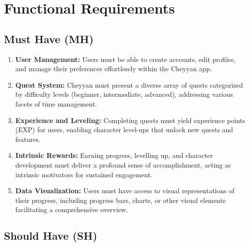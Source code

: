 \documentclass{l4proj}
\begin{document}
\section{Functional Requirements}
\subsection{Must Have (MH)}

\begin{enumerate}
    \item \textbf{User Management:} Users must be able to create accounts, edit profiles, and manage their preferences effortlessly within the Cheyyan app.
    
    \item \textbf{Quest System:} Cheyyan must present a diverse array of quests categorized by difficulty levels (beginner, intermediate, advanced), addressing various facets of time management.
    
    \item \textbf{Experience and Leveling:} Completing quests must yield experience points (EXP) for users, enabling character level-ups that unlock new quests and features.
    
    \item \textbf{Intrinsic Rewards:} Earning progress, levelling up, and character development must deliver a profound sense of accomplishment, acting as intrinsic motivators for sustained engagement.
    
    \item \textbf{Data Visualization:} Users must have access to visual representations of their progress, including progress bars, charts, or other visual elements facilitating a comprehensive overview.
    
    
\end{enumerate}

\subsection{Should Have (SH)}
\end{document}

